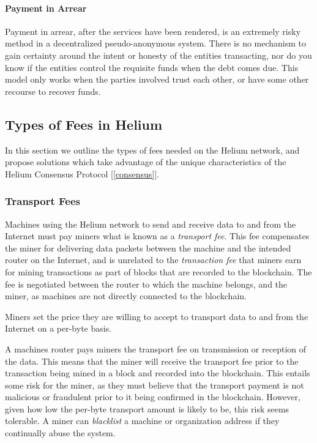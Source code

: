 \documentclass[10pt, nonatbib, nocopyrightspace, reprint]{sigplanconf}
\newcommand{\secref}[1]{[\autoref{#1}]}
\begin{document}
\paragraph{Payment in Arrear}
Payment in arrear, after the services have been rendered, is an extremely risky method in a decentralized pseudo-anonymous system. There is no mechanism to gain certainty around the intent or honesty of the entities transacting, nor do you know if the entities control the requisite funds when the debt comes due. This model only works when the parties involved trust each other, or have some other recourse to recover funds.

\subsection{Types of Fees in Helium}

In this section we outline the types of fees needed on the Helium network, and propose solutions which take advantage of the unique characteristics of the Helium Consensus Protocol \secref{consensus}.

\subsubsection{Transport Fees}

Machines using the Helium network to send and receive data to and from the Internet must pay miners what is known as a \emph{transport fee}. This fee compensates the miner for delivering data packets between the machine and the intended router on the Internet, and is unrelated to the \emph{transaction fee} that miners earn for mining transactions as part of blocks that are recorded to the blockchain. The fee is negotiated between the router to which the machine belongs, and the miner, as machines are not directly connected to the blockchain.

Miners set the price they are willing to accept to transport data to and from the Internet on a per-byte basis.

A machines router pays miners the transport fee on transmission or reception of the data. This means that the miner will receive the transport fee prior to the transaction being mined in a block and recorded into the blockchain. This entails some risk for the miner, as they must believe that the transport payment is not malicious or fraudulent prior to it being confirmed in the blockchain. However, given how low the per-byte transport amount is likely to be, this risk seems tolerable. A miner can \emph{blacklist} a machine or organization address if they continually abuse the system.
\end{document}
